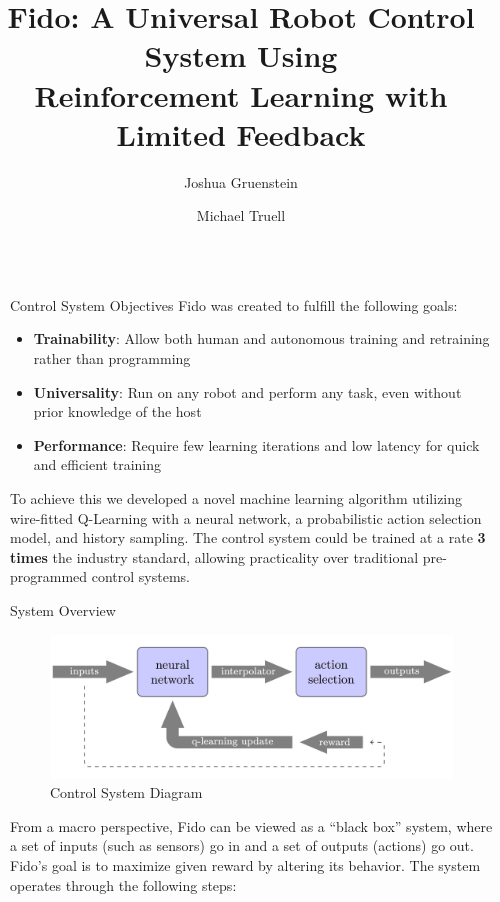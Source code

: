 \documentclass[final]{beamer}
\title{Fido: A Universal Robot Control System Using\\Reinforcement Learning with Limited Feedback}
\author{\LARGE Joshua Gruenstein \and Michael Truell}
\institute{\mbox{}}
\newlength{\sepwid}
\newlength{\onecolwid}
\begin{document}
\setlength{\belowcaptionskip}{2ex}
\setlength\belowdisplayshortskip{2ex}

\begin{frame}[t]
\begin{columns}[t]

\begin{column}{\sepwid}\end{column}
\begin{column}{\onecolwid}

	\begin{alertblock}{Control System Objectives}
		Fido was created to fulfill the following goals:
		\begin{itemize}
			\item \textbf{Trainability}: Allow both human and autonomous training and retraining rather than programming
			\item \textbf{Universality}: Run on any robot and perform any task, even without prior knowledge of the host
			\item \textbf{Performance}: Require few learning iterations and low latency for quick and efficient training
		\end{itemize}
		To achieve this we developed a novel machine learning algorithm utilizing wire-fitted Q-Learning with a neural network, a probabilistic action selection model, and history sampling.  The control system could be trained at a rate \textbf{3 times} the industry standard, allowing practicality over traditional pre-programmed control systems.
	\end{alertblock}

	\begin{block}{System Overview}
		\begin{figure}
			\centering
			\includegraphics[width=\linewidth]{Figures/diagramRendered.png}
			\caption{Control System Diagram}
		\end{figure}
		\vspace{-1cm}
		From a macro perspective, Fido can be viewed as a ``black box'' system, where a set of inputs (such as sensors) go in and a set of outputs (actions) go out.  Fido's goal is to maximize given reward by altering its behavior.  The system operates through the following steps:


\end{block}
\end{column}
\end{columns}
\end{frame}
\end{document}
